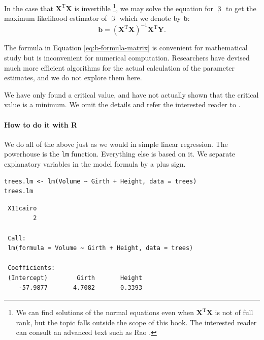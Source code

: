 \documentclass[captions=tableheading]{scrbook}
\begin{document}
In the case that \(\mathbf{X}^{\mathrm{T}}\mathbf{X}\) is invertible
\footnote{We can find solutions of the normal equations even when \(\mathbf{X}^{\mathrm{T}}\mathbf{X}\) is not of full rank, but the topic falls outside the scope of this book. The interested reader can consult an advanced text such as Rao \cite{Rao1999}.},
we may solve the equation for \(\upbeta\) to get the maximum likelihood estimator of \(\upbeta\) which we denote by \(\mathbf{b}\):
\begin{equation}
\mathbf{b}=\left(\mathbf{X}^{\mathrm{T}}\mathbf{X}\right)^{-1}\mathbf{X}^{\mathrm{T}}\mathbf{Y}.\label{eq:b-formula-matrix}
\end{equation}

\begin{rem}
The formula in Equation \ref{eq:b-formula-matrix} is convenient for mathematical study but is inconvenient for numerical computation. Researchers have devised much more efficient algorithms for the actual calculation of the parameter estimates, and we do not explore them here.
\end{rem}

\begin{rem}
We have only found a critical value, and have not actually shown that the critical value is a minimum. We omit the details and refer the interested reader to \cite{Rao1999}.
\end{rem}

\paragraph*{How to do it with \textsf{R}}

We do all of the above just as we would in simple linear regression. The powerhouse is the \texttt{lm} function. Everything else is based on it. We separate explanatory variables in the model formula by a plus sign.


\begin{verbatim}
trees.lm <- lm(Volume ~ Girth + Height, data = trees)
trees.lm
\end{verbatim}

\begin{verbatim}
 X11cairo 
        2
  
 Call:
 lm(formula = Volume ~ Girth + Height, data = trees)
 
 Coefficients:
 (Intercept)        Girth       Height  
    -57.9877       4.7082       0.3393
\end{verbatim}
\end{document}
